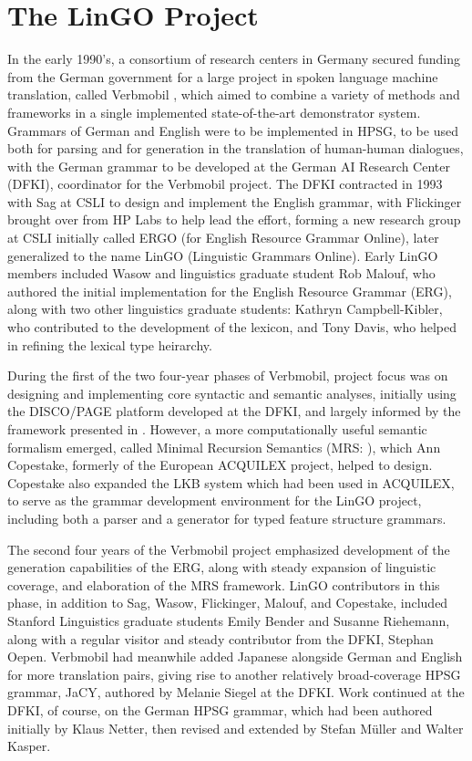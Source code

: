 \documentclass[output=paper]{langsci/langscibook}
\begin{document}
\section{The LinGO Project}

In the early 1990's, a consortium of research centers in Germany secured funding from the German government for a large project in spoken language machine translation, called Verbmobil \citep{Wahlster2000a-ed}, which aimed to combine a variety of methods and frameworks in a single implemented state-of-the-art demonstrator system.  Grammars of German and English were to be implemented in HPSG, to be used both for parsing and for generation in the translation of human-human dialogues, with the German grammar to be developed at the German AI Research Center (DFKI), coordinator for the Verbmobil project.  The DFKI contracted in 1993 with Sag at CSLI to design and implement the English grammar, with Flickinger brought over from HP Labs to help lead the effort, forming a new research group at CSLI initially called ERGO (for English Resource Grammar Online), later generalized to the name LinGO (Linguistic Grammars Online).  Early LinGO members included Wasow and linguistics graduate student Rob Malouf, who authored the initial implementation for the English Resource Grammar (ERG), along with two other linguistics graduate students: Kathryn Campbell-Kibler, who contributed to the development of the lexicon, and Tony Davis, who helped in refining the lexical type heirarchy.

During the first of the two four-year phases of Verbmobil, project focus was on designing and implementing core syntactic and semantic analyses, initially using the DISCO/PAGE platform developed at the DFKI, and largely informed by the framework presented in \citet{ps2}.  However, a more computationally useful semantic formalism emerged, called Minimal Recursion Semantics (MRS: \citet{CFPS2005a}), which Ann Copestake, formerly of the European ACQUILEX project, helped to design.  Copestake also expanded the LKB system \citep{Copestake2002a-Short} which had been used in ACQUILEX, to serve as the grammar development environment for the LinGO project, including both a parser and a generator for typed feature structure grammars.

The second four years of the Verbmobil project emphasized development of the generation capabilities of the ERG, along with steady expansion of linguistic coverage, and elaboration of the MRS framework.  LinGO contributors in this phase, in addition to Sag, Wasow, Flickinger, Malouf, and Copestake, included Stanford Linguistics graduate students Emily Bender and Susanne Riehemann, along with a regular visitor and steady contributor from the DFKI, Stephan Oepen.  Verbmobil had meanwhile added Japanese alongside German and English for more translation pairs, giving rise to another relatively broad-coverage HPSG grammar, JaCY, authored by Melanie Siegel at the DFKI.  Work continued at the DFKI, of course, on the German HPSG grammar, which had been authored initially by Klaus Netter, then revised and extended by Stefan M{\"u}ller and Walter Kasper.
\end{document}
